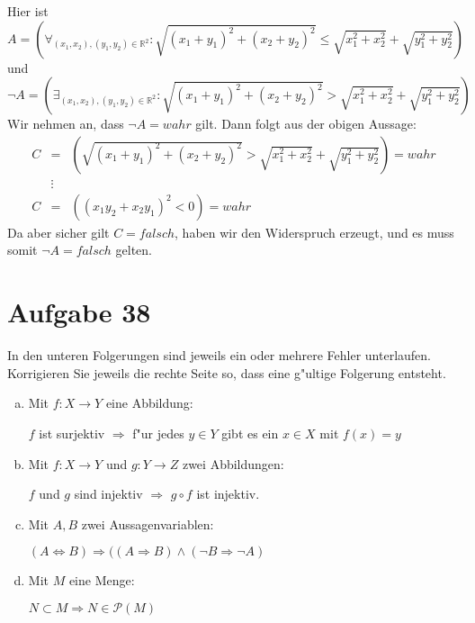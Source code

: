 \documentclass[10pt, oneside]{article}
\begin{document}
\begin{enumerate}[a)]
        Hier ist
        \begin{equation*}
            A = \left(\forall_{(x_1, x_2), (y_1, y_2) \in \mathbb{R}^2} : \sqrt{(x_1 + y_1)^2 + (x_2 + y_2)^2} \leq \sqrt{x_1^2 + x_2^2} + \sqrt{y_1^2 + y_2^2}\right)
        \end{equation*}
        und
        \begin{equation*}
            \lnot A = \left(\exists_{(x_1, x_2), (y_1, y_2) \in \mathbb{R}^2} : \sqrt{(x_1 + y_1)^2 + (x_2 + y_2)^2} > \sqrt{x_1^2 + x_2^2} + \sqrt{y_1^2 + y_2^2}\right)
        \end{equation*}
        Wir nehmen an, dass $\lnot A = wahr$ gilt. Dann folgt aus der obigen Aussage:
        \begin{equation*}
            \begin{array}{rcl}
                C &=& (\sqrt{(x_1 + y_1)^2 + (x_2 + y_2)^2} > \sqrt{x_1^2 + x_2^2} + \sqrt{y_1^2 + y_2^2}) = wahr \\
                  &\vdots& \\
                C &=& ((x_1y_2 + x_2y_1)^2 < 0) = wahr
            \end{array}
        \end{equation*}
        Da aber sicher gilt $C = falsch$, haben wir den Widerspruch erzeugt,
        und es muss somit $\lnot A = falsch$ gelten.
\end{enumerate}

\section{Aufgabe 38}

In den unteren Folgerungen sind jeweils ein oder mehrere Fehler unterlaufen.
Korrigieren Sie jeweils die rechte Seite so, dass eine g"ultige Folgerung
entsteht.

\begin{enumerate}[(a)]
    \item Mit $f : X \rightarrow Y$ eine Abbildung:

        \quad $f$ ist surjektiv $\Rightarrow$ f"ur jedes $y \in Y$ gibt es ein $x \in X$ mit $f(x) = y$
    \item Mit $f : X \rightarrow Y$ und $g: Y \rightarrow Z$ zwei Abbildungen:

        \quad $f$ und $g$ sind injektiv $\Rightarrow$ $g \circ f$ ist injektiv.
    \item Mit $A, B$ zwei Aussagenvariablen:

        \quad $(A \Leftrightarrow B) \Rightarrow ((A \Rightarrow B) \land (\lnot B \Rightarrow \lnot A)$
    \item Mit $M$ eine Menge:

        \quad $N \subset M \Rightarrow N \in \mathcal{P}(M)$
\end{enumerate}
\end{document}
